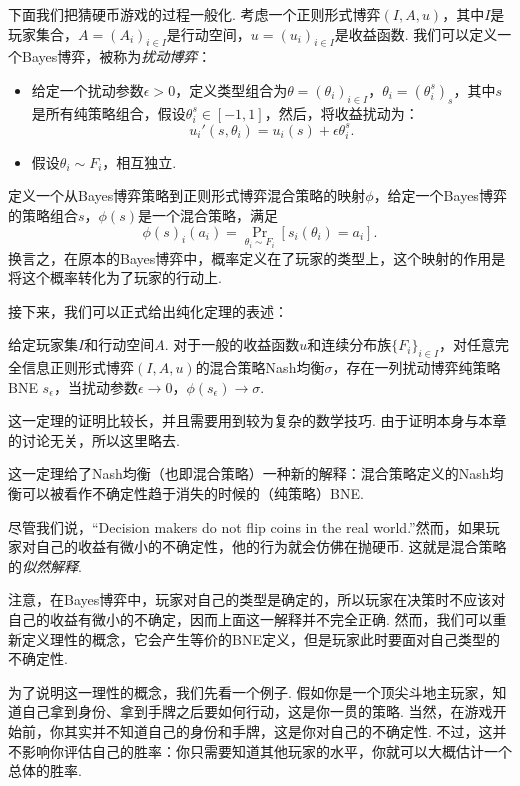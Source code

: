 下面我们把猜硬币游戏的过程一般化. 考虑一个正则形式博弈$(I,A,u)$，其中$I$是玩家集合，$A=(A_i)_{i\in I}$是行动空间，$u=(u_i)_{i\in I}$是收益函数. 我们可以定义一个Bayes博弈，被称为\textit{扰动博弈}：
\begin{itemize}
\item 给定一个扰动参数$\epsilon>0$，定义类型组合为$\theta=(\theta_i)_{i\in I}$，$\theta_i=(\theta_i^s)_s$，其中$s$是所有纯策略组合，假设$\theta_i^s\in[-1,1]$，然后，将收益扰动为：
    \[u_i'(s,\theta_i)=u_i(s)+\epsilon\theta_i^s.\]
    \item 假设$\theta_i\sim F_i$，相互独立.
\end{itemize}

定义一个从Bayes博弈策略到正则形式博弈混合策略的映射$\phi$，给定一个Bayes博弈的策略组合$s$，$\phi(s)$是一个混合策略，满足
\[\phi(s)_i(a_i)=\Pr_{\theta_i\sim F_i}[s_i(\theta_i)=a_i].\]
换言之，在原本的Bayes博弈中，概率定义在了玩家的类型上，这个映射的作用是将这个概率转化为了玩家的行动上.

接下来，我们可以正式给出纯化定理的表述：

\begin{theorem}
给定玩家集$I$和行动空间$A$. 对于一般的收益函数$u$和连续分布族$\{F_i\}_{i\in I}$，对任意完全信息正则形式博弈$(I,A,u)$的混合策略Nash均衡$\sigma$，存在一列扰动博弈纯策略BNE $s_\epsilon$，当扰动参数$\epsilon\to 0$，$\phi(s_\epsilon)\to \sigma$.
\end{theorem}
这一定理的证明比较长，并且需要用到较为复杂的数学技巧. 由于证明本身与本章的讨论无关，所以这里略去.

这一定理给了Nash均衡（也即混合策略）一种新的解释：混合策略定义的Nash均衡可以被看作不确定性趋于消失的时候的（纯策略）BNE. 

尽管我们说，“Decision makers do not flip coins in the real world.”然而，如果玩家对自己的收益有微小的不确定性，他的行为就会仿佛在抛硬币. 这就是混合策略的\textit{似然解释}.

注意，在Bayes博弈中，玩家对自己的类型是确定的，所以玩家在决策时不应该对自己的收益有微小的不确定，因而上面这一解释并不完全正确. 然而，我们可以重新定义理性的概念，它会产生等价的BNE定义，但是玩家此时要面对自己类型的不确定性. 

为了说明这一理性的概念，我们先看一个例子. 假如你是一个顶尖斗地主玩家，知道自己拿到身份、拿到手牌之后要如何行动，这是你一贯的策略. 当然，在游戏开始前，你其实并不知道自己的身份和手牌，这是你对自己的不确定性. 不过，这并不影响你评估自己的胜率：你只需要知道其他玩家的水平，你就可以大概估计一个总体的胜率. 

